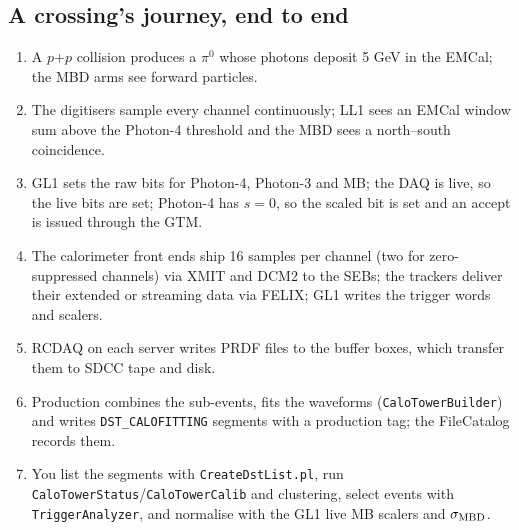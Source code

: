 \documentclass[11pt,letterpaper]{article}
\newcommand{\code}[1]{\texttt{#1}}
\begin{document}
\subsection*{A crossing's journey, end to end}
\begin{enumerate}
\item A $p$+$p$ collision produces a $\pi^0$ whose photons deposit 5 GeV in the EMCal; the MBD arms see forward particles.
\item The digitisers sample every channel continuously; LL1 sees an EMCal window sum above the Photon-4 threshold and the MBD sees a north--south coincidence.
\item GL1 sets the raw bits for Photon-4, Photon-3 and MB; the DAQ is live, so the live bits are set; Photon-4 has $s=0$, so the scaled bit is set and an accept is issued through the GTM.
\item The calorimeter front ends ship 16 samples per channel (two for zero-suppressed channels) via XMIT and DCM2 to the SEBs; the trackers deliver their extended or streaming data via FELIX; GL1 writes the trigger words and scalers.
\item RCDAQ on each server writes PRDF files to the buffer boxes, which transfer them to SDCC tape and disk.
\item Production combines the sub-events, fits the waveforms (\code{CaloTowerBuilder}) and writes \code{DST\_CALOFITTING} segments with a production tag; the FileCatalog records them.
\item You list the segments with \code{CreateDstList.pl}, run \code{CaloTowerStatus}/\code{CaloTowerCalib} and clustering, select events with \code{TriggerAnalyzer}, and normalise with the GL1 live MB scalers and $\sigma_{\rm MBD}$.
\end{enumerate}

\end{document}
